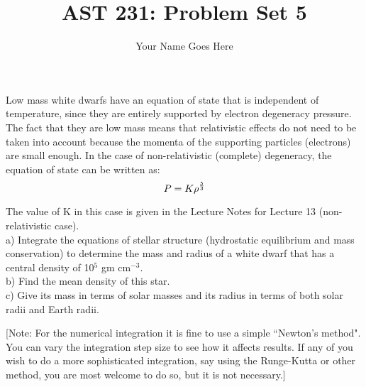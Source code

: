 \documentclass[12pt]{article}
\newenvironment{problem}[2][Problem]{\begin{trivlist}
\item[\hskip \labelsep {\bfseries #1}\hskip \labelsep {\bfseries #2.}]}{\end{trivlist}}
\begin{document}

\title{AST 231: Problem Set 5}
\author{Your Name Goes Here}
\maketitle

\begin{problem}{1}
Low mass white dwarfs have an equation of state that is independent of temperature, since they are entirely supported by electron degeneracy pressure. The fact that they are low mass means that relativistic effects do not need to be taken into account because the momenta of the supporting particles (electrons) are small enough. In the case of non-relativistic (complete) degeneracy, the equation of state can be written as: $$ P = K \rho^{5 \over 3}$$

The value of K in this case is given in the Lecture Notes for Lecture 13 (non-relativistic case). \\

a) Integrate the equations of stellar structure (hydrostatic equilibrium and mass conservation) to determine the mass and radius of a white dwarf that has a central density of 10$^5$ gm cm$^{-3}$. \\

b) Find the mean density of this star. \\

c) Give its mass in terms of solar masses and its radius in terms of both solar radii and Earth radii.

[Note: For the numerical integration it is fine to use a simple ``Newton's method". You can vary the integration step size to see how it affects results. If any of you wish to do a more sophisticated integration, say using the Runge-Kutta or other method, you are most welcome to do so, but it is not necessary.]
\end{problem}
\end{document}

